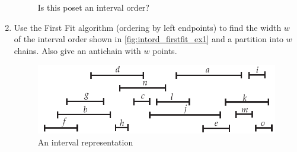 \begin{enumerate}
\begin{figure}[h]
\begin{center}
  \end{center}
  \caption{Is this poset an interval order?}\label{fig:intord_find_rep_ex3}
  \end{figure}
\item Use the First Fit algorithm (ordering by left endpoints) to find
  the width $w$ of the interval order shown in
  \autoref{fig:intord_firstfit_ex1} and a partition into $w$
  chains. Also give an antichain with $w$ points.
  \begin{figure}[h]
    \centering
    \includegraphics{posets-figs/intord_firstfit_ex1}
    \caption{An interval representation}
    \label{fig:intord_firstfit_ex1}
  \end{figure}
\end{enumerate}

